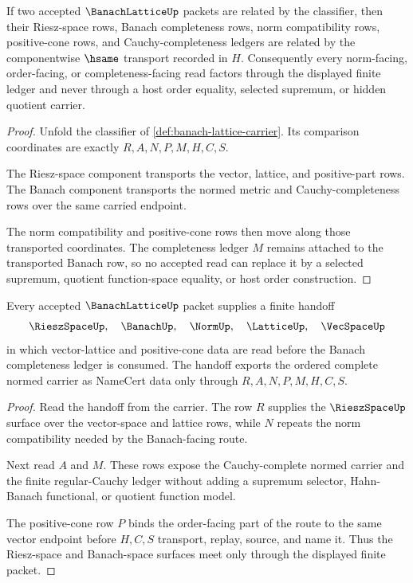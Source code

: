 \begin{theorem}
\label{thm:banach-lattice-classifier-stability}
If two accepted $\BanachLatticeUp$ packets are related by the classifier, then their Riesz-space rows, Banach completeness rows, norm compatibility rows, positive-cone rows, and Cauchy-completeness ledgers are related by the componentwise $\hsame$ transport recorded in $H$. Consequently every norm-facing, order-facing, or completeness-facing read factors through the displayed finite ledger and never through a host order equality, selected supremum, or hidden quotient carrier.
\end{theorem}
\begin{proof}
Unfold the classifier of \autoref{def:banach-lattice-carrier}. Its comparison coordinates are exactly $R,A,N,P,M,H,C,S$.

The Riesz-space component transports the vector, lattice, and positive-part rows. The Banach component transports the normed metric and Cauchy-completeness rows over the same carried endpoint.

The norm compatibility and positive-cone rows then move along those transported coordinates. The completeness ledger $M$ remains attached to the transported Banach row, so no accepted read can replace it by a selected supremum, quotient function-space equality, or host order construction.
\end{proof}

\begin{theorem}
\label{thm:banach-lattice-riesz-banach-handoff}
Every accepted $\BanachLatticeUp$ packet supplies a finite handoff
$$
\RieszSpaceUp,\quad \BanachUp,\quad \NormUp,\quad \LatticeUp,\quad \VecSpaceUp
$$
in which vector-lattice and positive-cone data are read before the Banach completeness ledger is consumed. The handoff exports the ordered complete normed carrier as NameCert data only through $R,A,N,P,M,H,C,S$.
\end{theorem}
\begin{proof}
Read the handoff from the carrier. The row $R$ supplies the $\RieszSpaceUp$ surface over the vector-space and lattice rows, while $N$ repeats the norm compatibility needed by the Banach-facing route.

Next read $A$ and $M$. These rows expose the Cauchy-complete normed carrier and the finite regular-Cauchy ledger without adding a supremum selector, Hahn-Banach functional, or quotient function model.

The positive-cone row $P$ binds the order-facing part of the route to the same vector endpoint before $H,C,S$ transport, replay, source, and name it. Thus the Riesz-space and Banach-space surfaces meet only through the displayed finite packet.
\end{proof}

